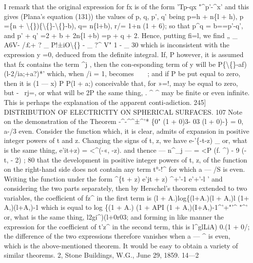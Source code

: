 \documentclass[11pt,a4paper]{book}
\begin{document}
I  remark  that  the  original  expression  for  fx  is  of  the  form
'Tp-qx  "^p'-^x'
and  this  gives  (Plana's  equation  (131))
the  values  of  p,  q,  p',  q'  being
p=h  +  n\{l  +  h),    p  =\{n  +  \textbackslash\{\})\{\textbackslash\{\}-\textbackslash\{\}-b),
q=         n\{l+b),     r/=    1+n  (1  +  6);
so   that
p^q  =  b==p'-q',  and  p' +  q' =2  +  b  +  2n\{l +b)  =p  +  q  +  2.
Hence,  putting  fi=l,  we  find
„  _  A6V- /£+ ?  _  P!±iO\textbackslash\{\}  -  _  ?^  V"  1  -  _  30
which   is  inconsistent  with   the   expression  y  =0,  deduced  from  the  definite  integral.     If,
P
however,  it  is  assumed   that  fx  contains   the   term  ^j  ,   then    the   con-esponding  term
of  y  will  be
P\{\textbackslash\{\}-af)
(l-2/ia;+a?)*'
which,   when   /i  =  1,    becomes     ~   ~  ;    and   if    P    be   put    equal    to    zero,   then    it    is
(1  —  x)
P                                                         P(l  +  a;)
conceivable   that,  for  »=!,        may  be  equal   to   zero,  but    -~   rj=,  or  what  will  be
2P
the  same  thing,  .    ^   ^  may  be  finite  or  even  infinite.     This  is  perhaps  the  explanation
of  the   apparent  conti-adiction.
245]  DISTRIBUTION   OF   ELECTRICITY   ON   SPHERICAL   SURFACES.  107
Note  on  the  demonstration  of  the  Theorem
-^-^^±^'*  \{0"  (1  +  0)3- 03  (l  +  0)-\}  =  0,     a-/3  even.
Consider  the  function
which,  it  is  clear,  admits  of  expansion  in  positive  integer  powers  of  t  and  z.    Changing
the   signs   of  t,  z,  we   have
e-'\{-t-z)      _
or,   what   is   the   same   thing,
e'it+z)
=  <^(-«,  -z).
and   thence
— ^^.^_j —  =  <P  (f.  ^)  -  9  (-  t,  -  2) ;
80  that  the  development  in  positive  integer  powers  of  t,  z,  of  the  function  on  the
right-hand  side  does  not  contain  any  term  t°-!^  for  which  a  — /S  is  even.  Writing  the
function  under  the  form
^\{t  +  z)     e'jt  +  z)
^+'-1       e'+'-l  '
and  considering  the  two  parts  separately,  then  by  Herschel's  theorem  extended  to  two
variables,   the   coefficient   of  fz^   in   the   first   term   is
(l  +  A.)log\{(l+A.)(l  +  A,)l
(1+ A,)(l+A,)-1
which   is   equal    to
log  \{(1  + A.)  (1  + API
(1  +  A,)(I+A,)-1^'+"'^  "^'
or,   what   is   the   same   thing,
l2gi^)(l+0r03;
and  forming  in  like  manner  the  expression  for  the  coefficient  of  t'z^  in  the  second
term,  this  is
l^glLiA)  0.(1  +  0/;
the  difference  of  the  two  expressions  therefore  vanishes  when  a  —  ^  is  even,  which  is
the  above-mentioned  theorem.     It  would  be  easy  to  obtain  a  variety  of  similar  theorems.
2,  Stone  Buildings,  W.G.,  June  29,  1859.
14—2
\end{document}
